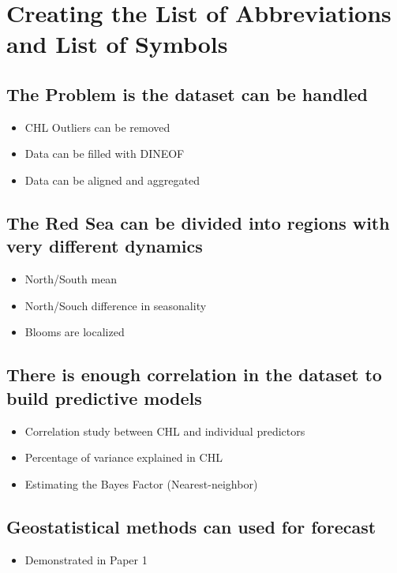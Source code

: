 \chapter{Creating the List of Abbreviations and List of Symbols}\label{chapter5}

\section{The Problem is the dataset can be handled}

\begin{itemize}
\item CHL Outliers can be removed
\item Data can be filled with DINEOF
\item Data can be aligned and aggregated
\end{itemize}

\section{The Red Sea can be divided into regions with very different dynamics}

\begin{itemize}
\item North/South mean
\item North/Souch difference in seasonality 
\item Blooms are localized
\end{itemize}

\section{There is enough correlation in the dataset to build predictive models}

\begin{itemize}
\item Correlation study between CHL and individual predictors
\item Percentage of variance explained in CHL
\item Estimating the Bayes Factor (Nearest-neighbor)
\end{itemize}

\section{Geostatistical methods can used for forecast}

\begin{itemize}
\item Demonstrated in Paper 1
\end{itemize}
